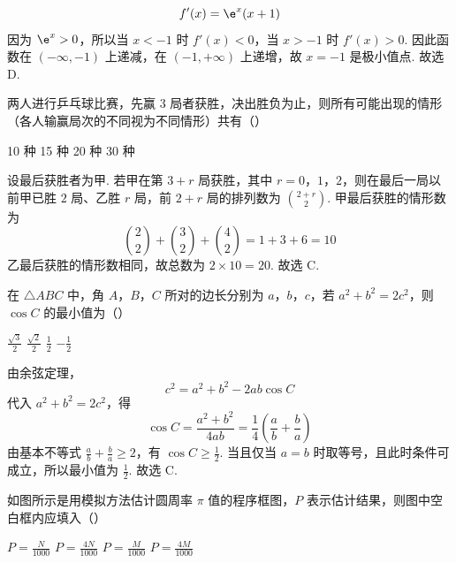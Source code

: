 
\begin{solution}
\[
f'(x)=\e^x(x+1)
\]
因为 \(\e^x>0\)，所以当 \(x<-1\) 时 \(f'(x)<0\)，当 \(x>-1\) 时 \(f'(x)>0\). 因此函数在 \((-\infty,-1)\) 上递减，在 \((-1,+\infty)\) 上递增，故 \(x=-1\) 是极小值点.
故选 D.
\end{solution}

\begin{problem}
两人进行乒乓球比赛，先赢 3 局者获胜，决出胜负为止，则所有可能出现的情形（各人输赢局次的不同视为不同情形）共有（\quad）


\choices
    {10 种}
    {15 种}
    {20 种}
    {30 种}
\end{problem}


\begin{solution}
设最后获胜者为甲. 若甲在第 \(3+r\) 局获胜，其中 \(r=0\)，\(1\)，\(2\)，则在最后一局以前甲已胜 \(2\) 局、乙胜 \(r\) 局，前 \(2+r\) 局的排列数为 \(\binom{2+r}{2}\). 甲最后获胜的情形数为
\[
\binom22+\binom32+\binom42=1+3+6=10
\]
乙最后获胜的情形数相同，故总数为 \(2\times10=20\). 故选 C.
\end{solution}

\begin{problem}
在 \(\triangle ABC\) 中，角 \(A\)，\(B\)，\(C\) 所对的边长分别为 \(a\)，\(b\)，\(c\)，若 \(a^2 + b^2 = 2c^2\)，则 \(\cos C\) 的最小值为（\quad）

\choices
    {\( \frac{\sqrt{3}}{2} \)}
    {\( \frac{\sqrt{2}}{2} \)}
    {\( \frac{1}{2} \)}
    {\(-\frac{1}{2}\)}
\end{problem}


\begin{solution}
由余弦定理，
\[
c^2=a^2+b^2-2ab\cos C
\]
代入 \(a^2+b^2=2c^2\)，得
\[
\cos C=\frac{a^2+b^2}{4ab}
=\frac14\left(\frac ab+\frac ba\right)
\]
由基本不等式 \(\frac{a}{b}+\frac{b}{a}\geqslant2\)，有 \(\cos C\geqslant\frac{1}{2}\). 当且仅当 \(a=b\) 时取等号，且此时条件可成立，所以最小值为 \(\frac{1}{2}\).
故选 C.
\end{solution}

\begin{problem}
如图所示是用模拟方法估计圆周率 \(\pi\) 值的程序框图，\(P\) 表示估计结果，则图中空白框内应填入（\quad）

\FloatBarrier

\choices
    {\(P = \frac{N}{1000}\)}
    {\(P = \frac{4N}{1000}\)}
    {\(P = \frac{M}{1000}\)}
    {\(P = \frac{4M}{1000}\)}
\end{problem}

